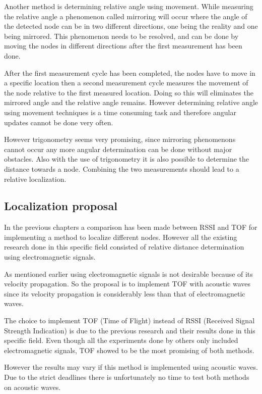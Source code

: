 \documentclass[10pt,a4paper]{article}
\begin{document}
Another method is determining relative angle using movement. While measuring the relative angle a phenomenon called mirroring will occur where the angle of the detected node can be in two different directions, one being the reality and one being mirrored. This phenomenon needs to be resolved, and can be done by moving the nodes in different directions after the first measurement has been done.

After the first measurement cycle has been completed, the nodes have to move in a specific location then a second measurement cycle measures the movement of the node relative to the first measured location. Doing so this will eliminates the mirrored angle and the relative angle remains. However determining relative angle using movement techniques is a time consuming task and therefore angular updates cannot be done very often.

However trigonometry seems very promising, since mirroring phenomenons cannot occur any more angular determination can be done without major obstacles. Also with the use of trigonometry it is also possible to determine the distance towards a node. Combining the two measurements should lead to a relative localization.

\subsection{Localization proposal}
In the previous chapters a comparison has been made between RSSI and TOF for implementing a method to localize different nodes. However all the existing research done in this specific field consisted of relative distance determination using electromagnetic signals.

As mentioned earlier using electromagnetic signals is not desirable because of its velocity propagation. So the proposal is to implement TOF with acoustic waves since its velocity propagation is considerably less than that of electromagnetic waves. 

The choice to implement TOF (Time of Flight) instead of RSSI (Received Signal Strength Indication) is due to the previous research and their results done in this specific field. Even though all the experiments done by others only included electromagnetic signals, TOF showed to be the most promising of both methods. 

However the results may vary if this method is implemented using acoustic waves. Due to the strict deadlines there is unfortunately no time to test both methods on acoustic waves.
\newpage
\end{document}
